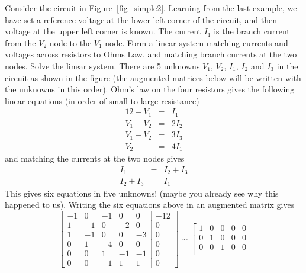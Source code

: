 \begin{example} \label{Ex:simple2} Consider the circuit in Figure~\ref{fig_simple2}. 
Learning from the last example, we have set a reference voltage at the lower 
left corner of the circuit, and then voltage at the upper left corner is 
known. The current $I_1$ is the branch current from the $V_2$ node to the $V_1$ 
node. Form a linear system matching currents and voltages across resistors 
to Ohms Law, and matching branch currents at the two nodes. Solve the linear system.  
{\rm There are 5 unknowns $V_1$, $V_2$, $I_1$, $I_2$ and $I_3$ in the circuit 
as shown in the figure (the augmented matrices below will be written 
with the unknowns in this order). Ohm's law on the four resistors gives the following 
linear equations (in order of small to large resistance) 
\begin{eqnarray*}
12-V_1 & = & I_1 \\
V_1-V_2 & = & 2I_2 \\
V_1-V_2 & = & 3I_3 \\
V_2 & = & 4I_1 
\end{eqnarray*}
and matching the currents at the two nodes gives 
\begin{eqnarray*}
I_1 & = & I_2 + I_3 \\
I_2 + I_3 & = & I_1 
\end{eqnarray*}
This gives six equations in five unknowns! (maybe you already see why this happened 
to us). Writing the six equations above in an augmented matrix gives 
\[
\left[
\begin{array}{ccccc}
-1 & 0 & -1& 0 & 0  \\
1 & -1 & 0 & -2 & 0 \\
1 & -1 & 0 & 0 & -3 \\
0 & 1 & -4 & 0 & 0 \\
0 & 0 & 1 & -1 & -1 \\
0 & 0 & -1 & 1 & 1  
\end{array}
\right|
\left.
\begin{array}{c}
-12 \\ 0 \\ 0\\0\\0\\0
\end{array}
\right]
\sim 
\left[
\begin{array}{ccccc}
1 & 0 & 0 & 0 & 0 \\
0 & 1 & 0 & 0 & 0 \\
0 & 0 & 1 & 0 & 0 \\

\end{array}\]}
\end{example}
